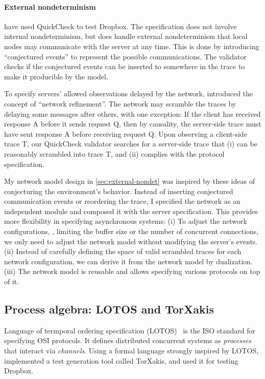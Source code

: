 \paragraph{External nondeterminism}
\citet{testing-dropbox} have used QuickCheck to test Dropbox.  The specification
does not involve internal nondeterminism, but does handle external
nondeterminism that local nodes may communicate with the server at any time.
This is done by introducing ``conjectured events'' to represent the possible
communications.  The validator checks if the conjectured events can be inserted
to somewhere in the trace to make it producible by the model.

To specify servers' allowed observations delayed by the network, \citet{cpp19}
introduced the concept of ``network refinement''.  The network may scramble the
traces by delaying some messages after others, with one exception: If the client
has received response \ilc A before it sends request \ilc Q, then by causality,
the server-side trace must have sent response \ilc A before receiving request
\ilc Q.  Upon observing a client-side trace \ilc T, our QuickCheck validator
searches for a server-side trace that (i) can be reasonably scrambled into trace
\ilc T, and (ii) complies with the protocol specification.

My network model design in \autoref{sec:external-nondet} was inspired by these
ideas of conjecturing the environment's behavior.  Instead of inserting
conjectured communication events or reordering the trace, I specified the
network as an independent module and composed it with the server specification.
This provides more flexibility in specifying asynchronous systems: (i) To adjust
the network configurations, \eg, limiting the buffer size or the number of
concurrent connections, we only need to adjust the network model without
modifying the server's events.  (ii) Instead of carefully defining the space of
valid scrambled traces for each network configuration, we can derive it from the
network model by dualization.  (iii) The network model is reusable and allows
specifying various protocols on top of it.

\subsection{Process algebra: LOTOS and TorXakis}
Language of termporal ordering specification (LOTOS)~\cite{lotos} is the ISO
standard for specifying OSI protocols.  It defines distributed concurrent
systems as {\em processes} that interact via {\em channels}.  Using a formal
language strongly inspired by LOTOS, \citet{torxakis-dropbox} implemented a test
generation tool called TorXakis, and used it for testing Dropbox.

